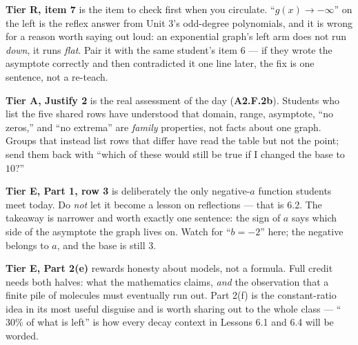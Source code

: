 \documentclass[10pt]{article}
\begin{document}
\begin{teachernote}
\textbf{Tier R, item 7} is the item to check first when you circulate. ``$g(x)\to-\infty$'' on the
left is the reflex answer from Unit 3's odd-degree polynomials, and it is wrong for a reason worth
saying out loud: an exponential graph's left arm does not run \emph{down}, it runs \emph{flat}. Pair
it with the same student's item 6 --- if they wrote the asymptote correctly and then contradicted it
one line later, the fix is one sentence, not a re-teach.

\textbf{Tier A, Justify 2} is the real assessment of the day (\textbf{A2.F.2b}). Students who list
the five shared rows have understood that domain, range, asymptote, ``no zeros,'' and ``no extrema''
are \emph{family} properties, not facts about one graph. Groups that instead list rows that differ
have read the table but not the point; send them back with ``which of these would still be true if I
changed the base to $10$?''

\textbf{Tier E, Part 1, row 3} is deliberately the only negative-$a$ function students meet today.
Do \emph{not} let it become a lesson on reflections --- that is 6.2. The takeaway is narrower and
worth exactly one sentence: the sign of $a$ says which side of the asymptote the graph lives on.
Watch for ``$b=-2$'' here; the negative belongs to $a$, and the base is still $3$.

\textbf{Tier E, Part 2(e)} rewards honesty about models, not a formula. Full credit needs both
halves: what the mathematics claims, \emph{and} the observation that a finite pile of molecules must
eventually run out. Part 2(f) is the constant-ratio idea in its most useful disguise and is worth
sharing out to the whole class --- ``$30\%$ of what is left'' is how every decay context in Lessons
6.1 and 6.4 will be worded.
\end{teachernote}
\end{document}
